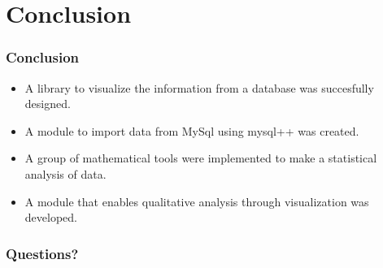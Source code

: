 \documentclass{beamer}
\begin{document}
\section{Conclusion}
\begin{frame}
\frametitle{Conclusion}
\begin{itemize}
\item A library to visualize the information from a database was succesfully designed.
\item A module to import data from MySql using mysql++ was created.
\item A group of mathematical tools were implemented to make a statistical analysis of data.
\item A module that enables qualitative analysis through visualization was developed. 
\end{itemize}
\end{frame}

\begin{frame}
\frametitle{Questions?}
\end{frame}
\end{document}
